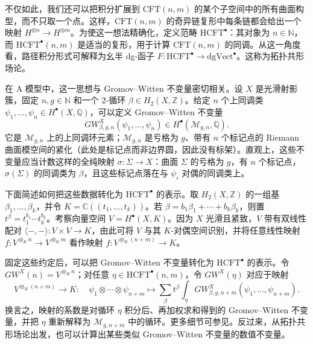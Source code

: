 不仅如此，我们还可以把积分扩展到 $\mathrm{CFT}(n,m)$ 的某个子空间中的所有曲面构型，而不只取一个点。这样，$\mathrm{CFT}(n,m)$ 的奇异链复形中每条链都会给出一个映射 $H^{\otimes n}\to H^{\otimes m}$。为使这一想法精确化，定义范畴 $\mathrm{HCFT}^\bullet$：其对象为 $n\in\mathbb N$，而 $\mathrm{HCFT}^\bullet(n,m)$ 是适当的复形，用于计算 $\mathrm{CFT}(n,m)$ 的同调。从这一角度看，路径积分形式可解释为幺半 dg-函子
$F\colon\mathrm{HCFT}^\bullet\to\mathrm{dgVect}^\bullet$。这称为拓扑共形场论。

\setcounter{exam}{12}\begin{example}
在 A 模型中，这一思想与 Gromov--Witten 不变量密切相关。设 $X$ 是光滑射影簇，固定 $n,g\in\mathbb N$ 和一个 $2$-循环 $\beta\in H_2(X,\mathbb Z)$。给定 $n$ 个上同调类 $\psi_1,\ldots,\psi_n\in H^\bullet(X,\mathbb Q)$，可以定义 Gromov--Witten 不变量
\[
  GW^X_{\beta,g,n}(\psi_1,\ldots,\psi_n)
  \in H^\bullet(\mathcal M_{g,n},\mathbb Q).
\]
它是 $\mathcal M_{g,n}$ 上的上同调环元素；$\mathcal M_{g,n}$ 是亏格为 $g$、带有 $n$ 个标记点的 Riemann 曲面模空间的紧化（此处是标记点而非边界圆，因此没有标架）。直观上，这些不变量应当计数这样的全纯映射 $\sigma\colon\Sigma\to X$：曲面 $\Sigma$ 的亏格为 $g$，有 $n$ 个标记点，$\sigma(\Sigma)$ 的同调类为 $\beta$，且这些标记点落在与 $\psi_i$ 对偶的同调类上。

下面简述如何把这些数据转化为 $\mathrm{HCFT}^\bullet$ 的表示。取 $H_2(X,\mathbb Z)$ 的一组基 $\beta_1,\ldots,\beta_k$，并令 $K=\mathbb C((t_1,\ldots,t_k))$。若 $\beta=b_1\beta_1+\cdots+b_k\beta_k$，则置 $t^\beta=t_1^{b_1}\cdots t_k^{b_k}$。考察向量空间 $V=H^\bullet(X,K)$。因为 $X$ 光滑且紧致，$V$ 带有双线性配对 $\langle-,-\rangle\colon V\times V\to K$，由此可将 $V$ 与其 $K$-对偶空间识别，并将任意线性映射 $f\colon V^{\otimes_K n}\to V^{\otimes_K m}$ 看作映射 $f\colon V^{\otimes_K(n+m)}\to K$。

固定这些约定后，可以把 Gromov--Witten 不变量转化为 $\mathrm{HCFT}^\bullet$ 的表示。令 $GW^X(n)=V^{\otimes_K n}$；对任意 $\eta\in\mathrm{HCFT}^\bullet(n,m)$，令 $GW^X(\eta)$ 对应于映射
\[
  V^{\otimes_K(n+m)}\to K:\quad
  \psi_1\otimes\cdots\otimes\psi_{n+m}\longmapsto
  \sum_\beta t^\beta\int_\eta
  GW^X_{\beta,g,n+m}(\psi_1,\ldots,\psi_{n+m}).
\]
换言之，映射的系数是对循环 $\eta$ 积分后、再加权求和得到的 Gromov--Witten 不变量，并把 $\eta$ 重新解释为 $\mathcal M_{g,n+m}$ 中的循环。更多细节可参见。反过来，从拓扑共形场论出发，也可以计算出某些类似 Gromov--Witten 不变量的数值不变量。
\end{example}

